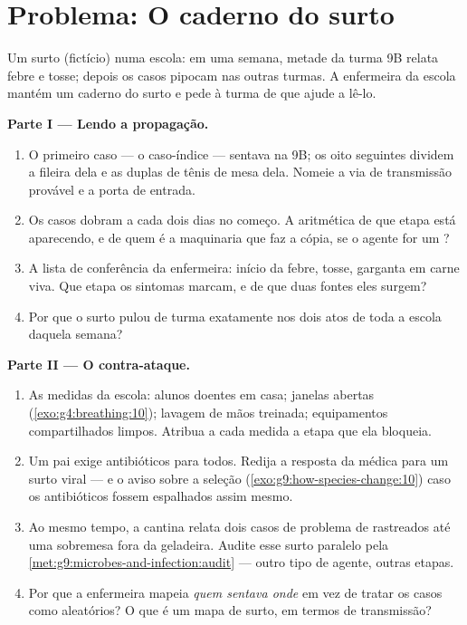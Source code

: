 \section{Problema: O caderno do surto}

\begin{problem}\label{pb:g9:microbes-and-infection:1}
Um surto (fictício) numa escola: em uma semana, metade da
turma 9B relata febre e tosse; depois os casos pipocam nas
outras turmas. A enfermeira da escola mantém um caderno do
surto e pede à turma de  que ajude a lê-lo.

\medskip\noindent\textbf{Parte I --- Lendo a propagação.}
\begin{enumerate}
  \item O primeiro caso --- o caso-índice --- sentava na 9B;
        os oito seguintes dividem a fileira dela e as duplas
        de tênis de mesa dela. Nomeie a via de transmissão
        provável e a porta de entrada.
  \item Os casos dobram a cada dois dias no começo. A
        aritmética de que etapa está aparecendo, e de quem é
        a maquinaria que faz a cópia, se o agente for um
        ?
  \item A lista de conferência da enfermeira: início da
        febre, tosse, garganta em carne viva. Que etapa os
        sintomas marcam, e de que duas fontes eles surgem?
  \item Por que o surto pulou de turma exatamente nos dois
        atos de toda a escola daquela semana?
\end{enumerate}

\medskip\noindent\textbf{Parte II --- O contra-ataque.}
\begin{enumerate}[resume]
  \item As medidas da escola: alunos doentes em casa; janelas
        abertas (\cref{exo:g4:breathing:10}); lavagem de mãos
        treinada; equipamentos compartilhados limpos.
        Atribua a cada medida a etapa que ela bloqueia.
  \item Um pai exige antibióticos para todos. Redija a
        resposta da médica para um surto viral --- e o aviso
        sobre a seleção
        (\cref{exo:g9:how-species-change:10}) caso os
        antibióticos fossem espalhados assim mesmo.
  \item Ao mesmo tempo, a cantina relata dois casos de
        problema de  rastreados até uma sobremesa
        fora da geladeira. Audite esse surto paralelo pela
        \cref{met:g9:microbes-and-infection:audit} --- outro
        tipo de agente, outras etapas.
  \item Por que a enfermeira mapeia \emph{quem sentava onde}
        em vez de tratar os casos como aleatórios? O que é um
        mapa de surto, em termos de transmissão?
\end{enumerate}


\end{problem}
